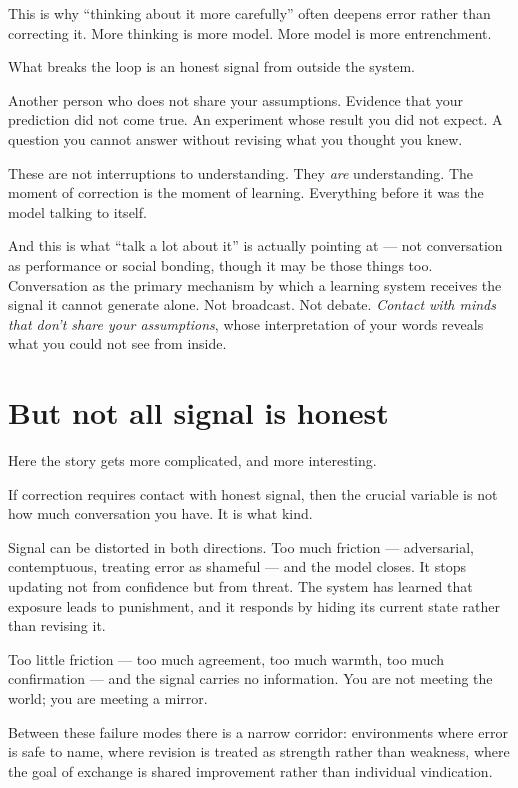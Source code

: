 \documentclass{article}
\begin{document}
This is why ``thinking about it more carefully'' often deepens error rather than correcting it. More thinking is more model. More model is more entrenchment.

What breaks the loop is an honest signal from outside the system.

Another person who does not share your assumptions. Evidence that your prediction did not come true. An experiment whose result you did not expect. A question you cannot answer without revising what you thought you knew.

These are not interruptions to understanding. They \textit{are} understanding. The moment of correction is the moment of learning. Everything before it was the model talking to itself.

And this is what ``talk a lot about it'' is actually pointing at --- not conversation as performance or social bonding, though it may be those things too. Conversation as the primary mechanism by which a learning system receives the signal it cannot generate alone. Not broadcast. Not debate. \textit{Contact with minds that don't share your assumptions}, whose interpretation of your words reveals what you could not see from inside.

\section*{But not all signal is honest}

Here the story gets more complicated, and more interesting.

If correction requires contact with honest signal, then the crucial variable is not how much conversation you have. It is what kind.

Signal can be distorted in both directions. Too much friction --- adversarial, contemptuous, treating error as shameful --- and the model closes. It stops updating not from confidence but from threat. The system has learned that exposure leads to punishment, and it responds by hiding its current state rather than revising it.

Too little friction --- too much agreement, too much warmth, too much confirmation --- and the signal carries no information. You are not meeting the world; you are meeting a mirror.

Between these failure modes there is a narrow corridor: environments where error is safe to name, where revision is treated as strength rather than weakness, where the goal of exchange is shared improvement rather than individual vindication.
\end{document}
